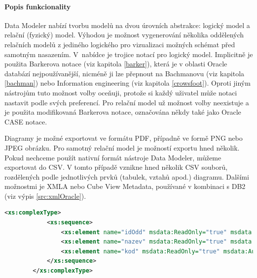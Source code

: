 \documentclass[czech,bachelor,public,dept460,male,oneside]{diploma}
\begin{document}
		
		\paragraph{Popis funkcionality}
		Data Modeler nabízí tvorbu modelů na dvou úrovních abstrakce: logický model a relační (fyzický) model. Výhodou je možnost vygenerování několika oddělených relačních modelů z jediného logického pro vizualizaci možných schémat před samotným nasazením. V~nabídce je trojice notací pro logický model. Implicitně je použita Barkerova notace (viz kapitola \ref{barker}), která je v oblasti Oracle databází nejpoužívanější, nicméně ji lze přepnout na Bachmanovu (viz kapitola \ref{bachman}) nebo Information engineering (viz kapitola \ref{crowsfoot}). Oproti jiným nástrojům tuto možnost volby oceňuji, protože si každý uživatel může notaci nastavit podle svých preferencí. Pro relační model už možnost volby neexistuje a je použita modifikovaná Barkerova notace, označována někdy také jako Oracle CASE notace.
		
		Diagramy je možné exportovat ve formátu PDF, případně ve formě PNG nebo JPEG obrázku. Pro samotný relační model je možností exportu hned několik. Pokud nechceme použít nativní formát nástroje Data Modeler, můžeme exportovat do CSV. V tomto případě vznikne hned několik CSV souborů, rozdělených podle jednotlivých prvků (tabulek, vztahů apod.) diagramu.  Dalšími možnostmi je XMLA nebo Cube View Metadata, používané v kombinaci s DB2 (viz výpis \ref{src:xmlOracle}). \\
				
		\begin{lstlisting}[language=xml,label=src:xmlOracle,caption=Příklad části exportu do XMLA]
		<xs:complexType>
			<xs:sequence>
				<xs:element name="idOdd" msdata:ReadOnly="true" msdata:AutoIncrement="true" msprop:FriendlyName="idOdd" msprop:DbColumnName="idOdd" msprop:DataSize="-1" type="xs:integer" />
				<xs:element name="nazev" msdata:ReadOnly="true" msdata:AutoIncrement="true" msprop:FriendlyName="nazev" msprop:DbColumnName="nazev" msprop:DataSize="100" type="xs:VARCHAR " />
				<xs:element name="kod" msdata:ReadOnly="true" msdata:AutoIncrement="true" msprop:FriendlyName="kod" msprop:DbColumnName="kod" msprop:DataSize="4" type="xs:CHAR " />
			</xs:sequence>
		</xs:complexType>
		\end{lstlisting}
		
\end{document}
